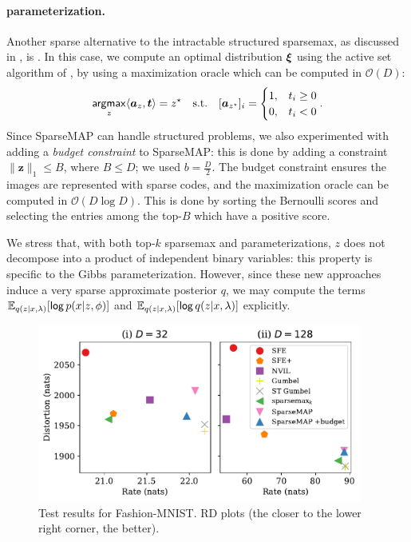 \paragraph*{\smap parameterization.} Another sparse alternative to the
intractable structured sparsemax, as discussed in
, is \smap. In this case, we compute an optimal
distribution $\bm{\xi}$ using the active set algorithm of
\citet{sparsemap}, by using a maximization oracle which
can be computed in $\mathcal{O}(D)$:
\begin{equation}
    \operatorname*{\mathsf{argmax}}_z \langle\bm{a}_z,\bm{t}\rangle = z^\star \quad \text{s.t.}\quad
    [\bm{a}_{z^\star}]_i = \begin{cases}
        1, & t_i \geq 0 \\
        0, & t_i < 0    \\
    \end{cases}.
\end{equation}
Since SparseMAP can handle structured problems, we also experimented
with adding a \emph{budget constraint} to SparseMAP: this is done by
adding a constraint $\|\bm{z}\|_1 \le B$, where $B \le D$; we used
$b=\frac{D}{2}$. The budget constraint ensures the images are
represented with sparse codes, and the maximization oracle can be
computed in $\mathcal{O}(D \log D)$. This
is done by sorting the Bernoulli scores and selecting the entries
among the top-$B$ which have a positive score.

We stress that, with both top-$k$ sparsemax and \smap parameterizations,
$z$ does not decompose into a product of independent
binary variables: this property is specific to the Gibbs parameterization.
However, since these new approaches induce a very sparse approximate posterior
$q$, we may compute the terms $\mathbb{E}_{q(z|x, \lambda)} [\operatorname*{\mathsf{log}} p(x |z,
        \phi)]$ and $\mathbb{E}_{q(z|x, \lambda)} [\operatorname*{\mathsf{log}} q(z |x, \lambda)]$
explicitly.

\begin{figure}[htbp]
    \centering
    \includegraphics[width=0.95\textwidth]{Figures/distortion-rate.pdf}
    \caption[Test results for Fashion-MNIST.]{\label{fig:distortion_rd}Test results for Fashion-MNIST. RD plots
        (the closer to the lower right corner, the better).}
\end{figure}

